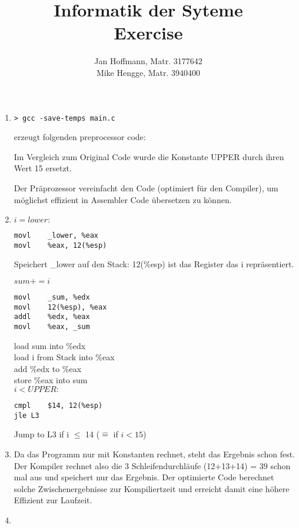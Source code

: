 \documentclass[10pt,a4paper]{article}
\title{Informatik der Syteme \\ Exercise \exnum}
\author{Jan Hoffmann, Matr. 3177642 \\ Mike Hengge,  Matr. 3940400}
\begin{document}
\section{}
	\begin{enumerate}
		\item 		
			\begin{lstlisting}[style=DOS] 
> gcc -save-temps main.c
			\end{lstlisting}
			erzeugt folgenden preprocessor code:
			
		
			Im Vergleich zum Original Code wurde die Konstante UPPER durch ihren Wert 15 ersetzt.
		
			Der Präprozessor vereinfacht den Code (optimiert für den Compiler), um möglichst effizient in Assembler Code übersetzen zu können.
			
		\item 
			$i = lower:$ \\
			\begin{lstlisting}[style=Assembler]
movl	_lower, %eax
movl	%eax, 12(%esp)
			\end{lstlisting}
			Speichert \_lower auf den Stack: 12(\%esp) ist das Register das i repräsentiert.
			
			$sum += i$ \\
			\begin{lstlisting}[style=Assembler]
movl	_sum, %edx
movl	12(%esp), %eax
addl	%edx, %eax
movl	%eax, _sum
			\end{lstlisting}
			load sum into \%edx\\
			load i from Stack into \%eax\\
			add \%edx to \%eax \\
			store \%eax into sum \\
			
			$i < UPPER:$\\
			\begin{lstlisting}[style=Assembler]
cmpl	$14, 12(%esp)
jle	L3			
			\end{lstlisting}
			Jump to L3 if i $\leq$ 14 ($\widehat{=}$ if $i < 15$)
		
		\item
			Da das Programm nur mit Konstanten rechnet, steht das Ergebnis schon fest. 
			Der Kompiler rechnet also die 3 Schleifendurchläufe (12+13+14) = 39 schon mal aus und speichert nur das Ergebnis.
			Der optimierte Code berechnet solche Zwischenergebnisse zur Kompiliertzeit und erreicht damit eine höhere Effizient zur Laufzeit.
		
		\item
			
	\end{enumerate}
\section{}
	
\end{document}

